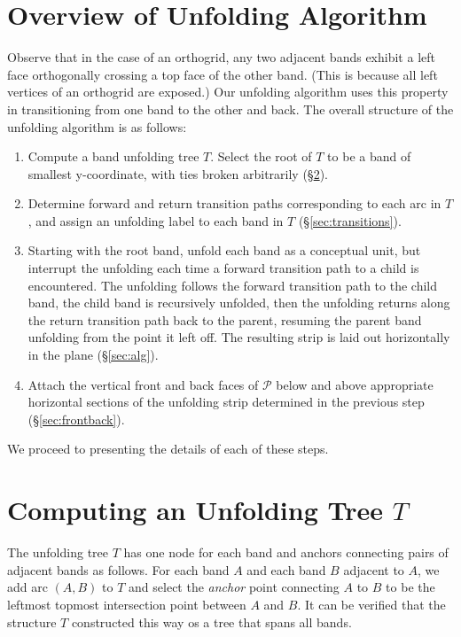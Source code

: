 \documentclass[11pt]{article}
\def\P{{\mathcal P}}
\begin{document}
\section{Overview of Unfolding Algorithm}
\label{sec:unfidea}
Observe that in the case of an orthogrid, any two adjacent bands exhibit a left face orthogonally crossing a top face of the other band. (This is because all left vertices of an orthogrid are exposed.) Our unfolding algorithm uses this property in transitioning from one band to the other and back. 
The overall structure of the unfolding algorithm is as follows:
\begin{enumerate}
\item Compute a band unfolding tree $T$. Select the root of $T$ to be a band of smallest y-coordinate, with ties broken arbitrarily (\S\ref{sec:unftree}).
\item Determine forward and return transition paths corresponding to each arc in $T$, and assign an unfolding label to each band in $T$ (\S\ref{sec:transitions}).
\item Starting with the root band, unfold each band as a conceptual unit, but interrupt the unfolding each time a forward transition path to a child is encountered. The unfolding follows the forward transition path to the child band, the child band is recursively unfolded, then the unfolding returns along the return transition  path back to the parent, resuming the parent band unfolding from the point it left off. The resulting strip is laid out horizontally in the plane (\S\ref{sec:alg}).
\item Attach the vertical front and back faces of $\P$ below and above appropriate horizontal sections of the unfolding strip determined in the previous step (\S\ref{sec:frontback}).
\end{enumerate}
We proceed to presenting the details of each of these steps.

\section{Computing an Unfolding Tree $T$}
\label{sec:unftree}
The unfolding tree $T$ has one node for each band and anchors connecting pairs of adjacent bands as follows. For each band $A$ and each band $B$ adjacent to $A$, we add arc $(A,B)$ to $T$ and select the \emph{anchor} point connecting $A$ to $B$ to be the  leftmost topmost intersection point between $A$ and $B$.  It can be verified that the structure $T$ constructed this way os a tree that spans all bands.
\end{document}
